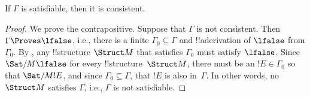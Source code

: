 \documentclass[../../include/open-logic-section]{subfiles}
\begin{document}
\begin{cor}
If $\Gamma$ is satisfiable, then it is consistent.
\end{cor}

\begin{proof}
We prove the contrapositive.  Suppose that $\Gamma$ is not
consistent.  Then $\Gamma \Proves \lfalse$, i.e., there is a finite
$\Gamma_0 \subseteq \Gamma$ and !!a{derivation} of $\lfalse$
from $\Gamma_0$. By , any !!{structure} 
$\Struct M$ that satisfies $\Gamma_0$ must satisfy $\lfalse$.  
Since $\Sat/{M}{\lfalse}$ for every !!{structure}~$\Struct M$,
there must be an $!E \in \Gamma_0$ so that $\Sat/{M}{!E}$, 
and since $\Gamma_0 \subseteq \Gamma$, that $!E$ is also
in~$\Gamma$.  In other words, no $\Struct M$ satisfies $\Gamma$, 
i.e., $\Gamma$ is not satisfiable.
\end{proof}
\end{document}
